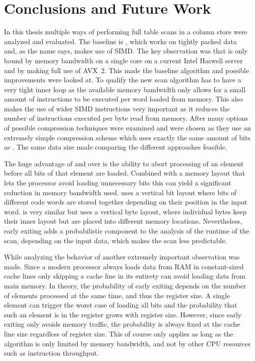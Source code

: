 \chapter{Conclusions and Future Work}

In this thesis multiple ways of performing full table scans in a column
store were analyzed and evaluated. The baseline is \simdscan{}, which works on
tightly packed data and, as the name says, makes use of SIMD. The key
observation was that \simdscan{} is only bound by memory bandwidth on a single
core on a current Intel Haswell server and by making full use of AVX~2. This
made \simdscan{} the baseline algorithm and possible improvements were looked
at. To qualify the new scan algorithm has to have a very tight inner loop as
the available memory bandwidth only allows for a small amount of instructions
to be executed per word loaded from memory. This also makes the use of wider
SIMD instructions very important as it reduces the number of instructions
executed per byte read from memory. After many options of possible compression
techniques were examined \bwv{} and \bs{} were chosen as they use an extremely
simple compression scheme which uses exactly the same amount of bits as
\simdscan{}. The same data size made comparing the different approaches
feasible.

The huge advantage of \bwv{} and \bs{} over \simdscan{} is the ability to abort
processing of an element before all bits of that element are loaded. Combined
with a memory layout that lets the processor avoid loading unnecessary bits
this can yield a significant reduction in memory bandwidth used. \bwv{} uses a
vertical bit layout where bits of different code words are stored together
depending on their position in the input word. \bs{} is very similar but uses a
vertical byte layout, where individual bytes keep their inner layout but are
placed into different memory locations. Nevertheless, early exiting adds a
probabilistic component to the analysis of the runtime of the scan, depending on
the input data, which makes the scan less predictable.

While analyzing the behavior of \bwv{} another extremely important observation
was made. Since a modern processor always loads data from RAM in constant-sized
cache lines only skipping a cache line in its entirety can avoid loading data
from main memory. In theory, the probability of early exiting depends on the
number of elements processed at the same time, and thus the register size. A
single element can trigger the worst case of loading all bits and the
probability that such an element is in the register grows with register size.
However, since early exiting only avoids memory traffic, the probability is
always fixed at the cache line size regardless of register size. This of course
only applies as long as the algorithm is only limited by memory bandwidth, and
not by other CPU resources such as instruction throughput.

